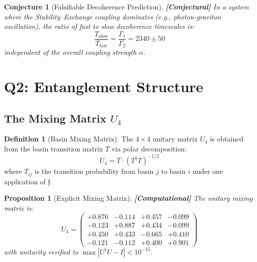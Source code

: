 \documentclass[12pt,a4paper]{article}
\newcommand{\computational}[1]{\textcolor{computational}{\textbf{[Computational]}} #1}
\newcommand{\conjectural}[1]{\textcolor{conjectural}{\textbf{[Conjectural]}} #1}
\newtheorem{proposition}[theorem]{Proposition}
\newtheorem{conjecture}[theorem]{Conjecture}
\theoremstyle{definition}
\newtheorem{definition}[theorem]{Definition}
\theoremstyle{remark}
\newcommand{\Reeds}{\mathfrak{f}}
\newcommand{\Umix}{U_4}
\begin{document}
\begin{conjecture}[Falsifiable Decoherence Prediction]
\label{conj:decoherence}
\conjectural{In a system where the Stability--Exchange coupling dominates
(e.g., photon-graviton oscillation), the ratio of fast to slow decoherence
timescales is:}
\begin{equation}
  \frac{T_{\text{slow}}}{T_{\text{fast}}} = \frac{\Gamma_1}{\Gamma_2} = 2340 \pm 50
\end{equation}
independent of the overall coupling strength $\alpha$.
\end{conjecture}

\section{Q2: Entanglement Structure}
\label{sec:entanglement}

\subsection{The Mixing Matrix $\Umix$}

\begin{definition}[Basin Mixing Matrix]
\label{def:mixing}
The $4 \times 4$ unitary matrix $\Umix$ is obtained from the basin transition
matrix $T$ via polar decomposition:
\begin{equation}
  \Umix = T \cdot (T^\dagger T)^{-1/2}
\end{equation}
where $T_{ij}$ is the transition probability from basin $j$ to basin $i$ under
one application of $\Reeds$.
\end{definition}

\begin{proposition}[Explicit Mixing Matrix]
\label{prop:mixing}
\computational{The unitary mixing matrix is:}
\begin{equation}
\Umix = \begin{pmatrix}
  +0.876 & -0.114 & +0.457 & -0.099 \\
  -0.123 & +0.887 & +0.434 & -0.099 \\
  +0.450 & +0.433 & -0.665 & +0.410 \\
  -0.121 & -0.112 & +0.400 & +0.901
\end{pmatrix}
\end{equation}
with unitarity verified to $\max|U^\dagger U - I| < 10^{-15}$.
\end{proposition}
\end{document}
